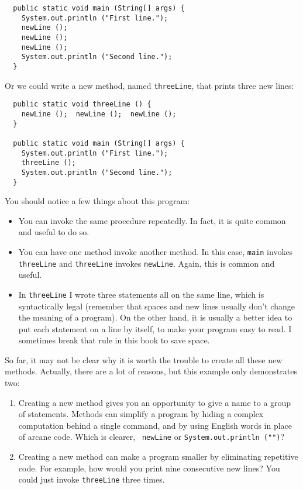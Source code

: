\documentclass{book}
\begin{document}
\begin{verbatim}
  public static void main (String[] args) {
    System.out.println ("First line.");
    newLine ();
    newLine ();
    newLine ();
    System.out.println ("Second line.");
  }
\end{verbatim}
%
Or we could write a new method, named {\tt threeLine}, that 
prints three new lines:

\begin{verbatim}
  public static void threeLine () {
    newLine ();  newLine ();  newLine ();
  }

  public static void main (String[] args) {
    System.out.println ("First line.");
    threeLine ();
    System.out.println ("Second line.");
  }
\end{verbatim}
%
You should notice a few things about this program:

\begin{itemize}

\item You can invoke the same procedure repeatedly.  In
fact, it is quite common and useful to do so.

\item You can have one method invoke another method.  In this
case, {\tt main} invokes {\tt threeLine} and {\tt threeLine}
invokes {\tt newLine}.  Again, this is common and useful.

\item In {\tt threeLine} I wrote three statements all on the
same line, which is syntactically legal (remember that spaces
and new lines usually don't change the meaning of a program).
On the other hand, it is usually a better idea to put each
statement on a line by itself, to make your program easy to
read.  I sometimes break that rule in this book to save space.

\end{itemize}

So far, it may not be clear why it is worth the trouble to
create all these new methods.  Actually, there are a lot
of reasons, but this example only demonstrates two:

\begin{enumerate}

\item Creating a new method gives you an opportunity to
give a name to a group of statements.  Methods can simplify a program
by hiding a complex computation behind a single command, and by using
English words in place of arcane code.  Which is clearer, {\tt
newLine} or {\tt System.out.println ("")}?

\item Creating a new method can make a program smaller by eliminating
repetitive code.  For example, how would you print nine consecutive
new lines?  You could just invoke {\tt threeLine} three times.

\end{enumerate}
\end{document}
